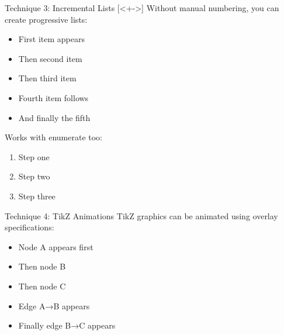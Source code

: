 \documentclass[aspectratio=169]{beamer}
\begin{document}
\begin{frame}{Technique 3: Incremental Lists [<+->]}
    Without manual numbering, you can create progressive lists:
    
    \begin{itemize}[<+->]
        \item First item appears
        \item Then second item
        \item Then third item
        \item Fourth item follows
        \item And finally the fifth
    \end{itemize}
    
    \vspace{1em}
    
    Works with enumerate too:
    \begin{enumerate}[<+->]
        \item Step one
        \item Step two
        \item Step three
    \end{enumerate}
\end{frame}

\begin{frame}{Technique 4: TikZ Animations}
    TikZ graphics can be animated using overlay specifications:
    
    \vspace{1em}
    
    \begin{center}
    \end{center}
    
    \vspace{1em}
    
    \begin{itemize}
        \item<1-> Node A appears first
        \item<2-> Then node B
        \item<3-> Then node C
        \item<4-> Edge A→B appears
        \item<5-> Finally edge B→C appears
    \end{itemize}
\end{frame}
\end{document}
